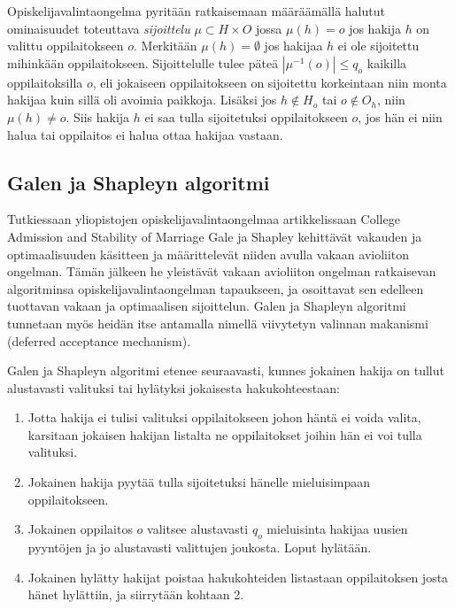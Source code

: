 \documentclass[gradu, twoside]{tktltiki}
\begin{document}
Opiskelijavalintaongelma pyritään ratkaisemaan määräämällä halutut
ominaisuudet toteuttava \emph{sijoittelu} $\mu \subset H \times O$
jossa $\mu(h) = o$ jos hakija $h$ on valittu oppilaitokseen $o$.
Merkitään $\mu(h) = \emptyset$ jos hakijaa $h$ ei ole sijoitettu
mihinkään oppilaitokseen. Sijoittelulle tulee päteä $|\mu^{-1}(o)|
\leq q_o$ kaikilla oppilaitoksilla $o$, eli jokaiseen oppilaitokseen
on sijoitettu korkeintaan niin monta hakijaa kuin sillä oli avoimia
paikkoja. Lisäksi jos $h \notin H_o$ tai $o \notin O_h$, niin $\mu(h)
\neq o$. Siis hakija $h$ ei saa tulla sijoitetuksi oppilaitokseen $o$,
jos hän ei niin halua tai oppilaitos ei halua ottaa hakijaa vastaan.

\subsection{Galen ja Shapleyn algoritmi}

Tutkiessaan yliopistojen opiskelijavalintaongelmaa artikkelissaan
College Admission and Stability of Marriage Gale ja Shapley kehittävät
vakauden ja optimaalisuuden käsitteen ja määrittelevät niiden avulla
vakaan avioliiton ongelman. Tämän jälkeen he yleistävät vakaan
avioliiton ongelman ratkaisevan algoritminsa opiskelijavalintaongelman
tapaukseen, ja osoittavat sen edelleen tuottavan vakaan ja
optimaalisen sijoittelun. Galen ja Shapleyn algoritmi tunnetaan myös
heidän itse antamalla nimellä viivytetyn valinnan makanismi (deferred
acceptance mechanism). \cite{galeshapley62}

Galen ja Shapleyn algoritmi etenee seuraavasti, kunnes jokainen hakija
on tullut alustavasti valituksi tai hylätyksi jokaisesta
hakukohteestaan:

\begin{enumerate}
\item Jotta hakija ei tulisi valituksi oppilaitokseen johon häntä ei
  voida valita, karsitaan jokaisen hakijan listalta ne oppilaitokset
  joihin hän ei voi tulla valituksi.

\item Jokainen hakija pyytää tulla sijoitetuksi hänelle mieluisimpaan
  oppilaitokseen.

\item Jokainen oppilaitos $o$ valitsee alustavasti $q_o$ mieluisinta
  hakijaa uusien pyyntöjen ja jo alustavasti valittujen joukosta.
  Loput hylätään.

\item Jokainen hylätty hakijat poistaa hakukohteiden listastaan
  oppilaitoksen josta hänet hylättiin, ja siirrytään kohtaan 2.
\end{enumerate}
\end{document}
